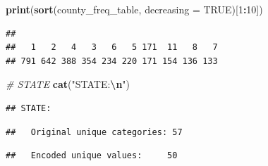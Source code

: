 \documentclass[
]{article}
\newenvironment{Shaded}{\begin{snugshade}}{\end{snugshade}}
\newcommand{\AttributeTok}[1]{\textcolor[rgb]{0.13,0.29,0.53}{#1}}
\newcommand{\CommentTok}[1]{\textcolor[rgb]{0.56,0.35,0.01}{\textit{#1}}}
\newcommand{\ConstantTok}[1]{\textcolor[rgb]{0.56,0.35,0.01}{#1}}
\newcommand{\DecValTok}[1]{\textcolor[rgb]{0.00,0.00,0.81}{#1}}
\newcommand{\FunctionTok}[1]{\textcolor[rgb]{0.13,0.29,0.53}{\textbf{#1}}}
\newcommand{\NormalTok}[1]{#1}
\newcommand{\SpecialCharTok}[1]{\textcolor[rgb]{0.81,0.36,0.00}{\textbf{#1}}}
\newcommand{\StringTok}[1]{\textcolor[rgb]{0.31,0.60,0.02}{#1}}
\begin{document}
\begin{Shaded}
\begin{Highlighting}[]
\FunctionTok{print}\NormalTok{(}\FunctionTok{sort}\NormalTok{(county\_freq\_table, }\AttributeTok{decreasing =} \ConstantTok{TRUE}\NormalTok{)[}\DecValTok{1}\SpecialCharTok{:}\DecValTok{10}\NormalTok{])}
\end{Highlighting}
\end{Shaded}

\begin{verbatim}
## 
##   1   2   4   3   6   5 171  11   8   7 
## 791 642 388 354 234 220 171 154 136 133
\end{verbatim}

\begin{Shaded}
\begin{Highlighting}[]
\CommentTok{\# STATE}
\FunctionTok{cat}\NormalTok{(}\StringTok{"STATE:}\SpecialCharTok{\textbackslash{}n}\StringTok{"}\NormalTok{)}
\end{Highlighting}
\end{Shaded}

\begin{verbatim}
## STATE:
\end{verbatim}

\begin{Shaded}
\end{Shaded}

\begin{verbatim}
##   Original unique categories: 57
\end{verbatim}

\begin{Shaded}
\end{Shaded}

\begin{verbatim}
##   Encoded unique values:     50
\end{verbatim}
\end{document}
